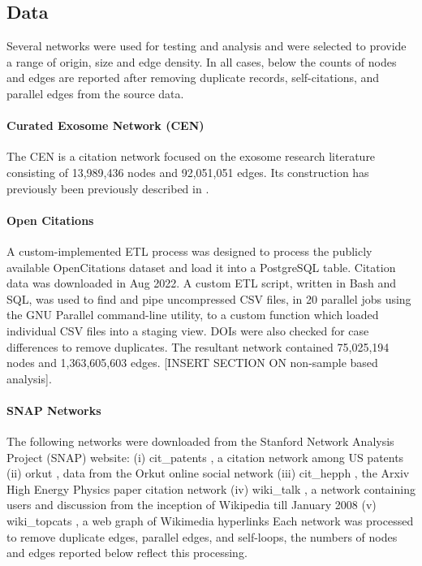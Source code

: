 \documentclass[12pt, oneside]{article}   	%
\begin{document}
\subsection{Data} Several networks were used for testing and analysis and were selected to provide a range of origin, size and edge density. In all cases, below the counts of nodes and edges are reported after removing duplicate records, 
self-citations, and parallel edges from the source data. 

\paragraph{Curated Exosome Network (CEN)}
The CEN is a citation network focused on the exosome research literature consisting of 13,989,436 nodes and 92,051,051 edges. Its construction has previously been previously described in \cite{Jakatdar_2022}.  

\paragraph{Open Citations}
A custom-implemented ETL process was designed to process the publicly available OpenCitations dataset \citep{Peroni2020} and load it into a PostgreSQL table. Citation data was downloaded in Aug 2022. A custom ETL script, written in Bash and SQL, was used to find and pipe uncompressed CSV files, in 20 parallel jobs using the GNU Parallel command-line utility, to a custom function which loaded individual CSV files into a staging view. DOIs were also checked for case differences to remove duplicates.  The resultant network contained 75,025,194 nodes and 1,363,605,603 edges.  [INSERT SECTION ON non-sample based analysis].

\paragraph{SNAP Networks}The following networks were downloaded from the Stanford Network Analysis Project (SNAP) website: (i) cit\_patents \citep{Leskovec2005}, a citation network among US patents (ii) orkut \citep{Yang2013}, data from the Orkut online social network (iii) cit\_hepph \citep{Leskovec2005}, the Arxiv High Energy Physics paper citation network  (iv) wiki\_talk \citep{Leskovec2010}, a network containing users and discussion from the inception of Wikipedia till January 2008 (v) wiki\_topcats \citep{Yin2017}, a web graph of Wikimedia hyperlinks Each network was processed to remove duplicate edges, parallel edges, and self-loops, the numbers of nodes and edges reported below reflect this processing. 
\end{document}
